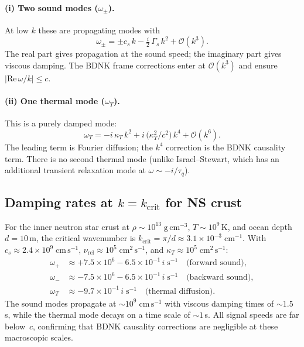 \paragraph{(i) Two sound modes ($\omega_\pm$).}
At low $k$ these are propagating modes with
\begin{equation}
\label{eq:rel-bdnk-sound}
\omega_\pm = \pm c_s\,k - \tfrac{i}{2}\,\Gamma_s\,k^2
  + \mathcal{O}(k^3).
\end{equation}
The real part gives propagation at the sound speed; the imaginary part
gives viscous damping.  The BDNK frame corrections enter at
$\mathcal{O}(k^3)$ and ensure $|\mathrm{Re}\,\omega/k| \leq c$.

\paragraph{(ii) One thermal mode ($\omega_T$).}
This is a purely damped mode:
\begin{equation}
\label{eq:rel-bdnk-thermal}
\omega_T = -i\,\kappa_T\,k^2
  + i\,\bigl(\kappa_T^2/c^2\bigr)\,k^4
  + \mathcal{O}(k^6).
\end{equation}
The leading term is Fourier diffusion; the $k^4$ correction is the
BDNK causality term.  There is no second thermal mode (unlike
Israel--Stewart, which has an additional transient relaxation mode at
$\omega \sim -i/\tau_q$).

\subsection{Damping rates at $k = k_{\mathrm{crit}}$ for NS crust}

For the inner neutron star crust at $\rho \sim 10^{13}\;\mathrm{g\,cm^{-3}}$,
$T \sim 10^9$\,K, and ocean depth $d = 10$\,m, the critical wavenumber is
$k_{\mathrm{crit}} = \pi/d \approx 3.1 \times 10^{-3}\;\mathrm{cm^{-1}}$.
With $c_s \approx 2.4 \times 10^{9}\;\mathrm{cm\,s^{-1}}$,
$\nu_{\mathrm{rel}} \approx 10^5\;\mathrm{cm^2\,s^{-1}}$, and
$\kappa_T \approx 10^5\;\mathrm{cm^2\,s^{-1}}$:
\begin{align}
\omega_+ &\approx +7.5 \times 10^6 - 6.5 \times 10^{-1}\,i
  \;\mathrm{s^{-1}} \quad\text{(forward sound)}, \nonumber\\
\omega_- &\approx -7.5 \times 10^6 - 6.5 \times 10^{-1}\,i
  \;\mathrm{s^{-1}} \quad\text{(backward sound)}, \nonumber\\
\omega_T &\approx -9.7 \times 10^{-1}\,i
  \;\mathrm{s^{-1}} \quad\text{(thermal diffusion)}.
\label{eq:rel-bdnk-ns-modes}
\end{align}
The sound modes propagate at $\sim 10^{9}\;\mathrm{cm\,s^{-1}}$ with
viscous damping times of $\sim 1.5$\,s, while the thermal mode decays
on a time scale of $\sim 1$\,s.  All signal speeds are far below~$c$,
confirming that BDNK causality corrections are negligible at these
macroscopic scales.

